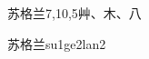 \begin{entry}{苏格兰}{7,10,5}{⾋、⽊、⼋}
  \begin{phonetics}{苏格兰}{su1ge2lan2}
  \end{phonetics}
\end{entry}
